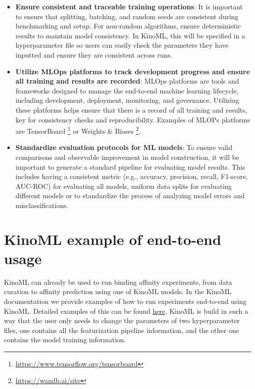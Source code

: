 \documentclass[9pt,lessons, pubversion]{livecoms}
\begin{document}
\begin{itemize}
\item\textbf{Ensure consistent and traceable training operations}: It is important to ensure that splitting, batching, and random seeds are consistent during benchmarking and setup. For non-random algorithms, ensure deterministic results to maintain model consistency. In KinoML, this will be specified in a hyperparameter file so users can easily check the parameters they have inputted and ensure they are consistent across runs. 

\item\textbf{Utilize MLOps platforms to track development progress and ensure all training and results are recorded}: MLOps platforms are tools and frameworks designed to manage the end-to-end machine learning lifecycle, including development, deployment, monitoring, and governance. Utilizing these platforms helps ensure that there is a record of all training and results, key for consistency checks and reproducibility. Examples of MLOPs platforms are TensorBoard \footnote{\href{https://www.tensorflow.org/tensorboard}{https://www.tensorflow.org/tensorboard}} or Weights \& Biases \footnote{\href{https://wandb.ai/site}{https://wandb.ai/site}}.

\item\textbf{Standardize evaluation protocols for ML models}: To ensure valid comparisons and observable improvement in model construction, it will be important to generate a standard pipeline for evaluating model results. This includes having a consistent metric (e.g., accuracy, precision, recall, F1-score, AUC-ROC) for evaluating all models, uniform data splits for evaluating different models or to standardize the process of analyzing model errors and misclassifications.


\end{itemize}

\section{KinoML example of end-to-end usage}

KinoML can already be used to run binding affinity experiments, from data curation to affinity prediction using one of KinoML models. In the KinoML documentation we provide examples of how to run experiments end-to-end using KinoML. Detailed examples of this can be found \href{https://github.com/openkinome/kinoml/tree/master/tutorials/experiments}{here}. KinoML is build in such a way that the user only needs to change the parameters of two hyperparameter files, one contains all the featurization pipeline information, and the other one contains the model training information. 
\end{document}

